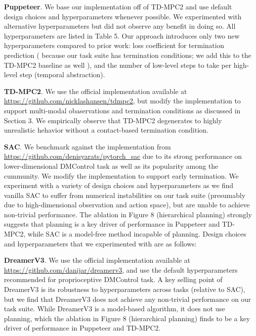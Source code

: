 \documentclass[sn-mathphys-num]{sn-jnl}%
\theoremstyle{thmstyleone}%
\theoremstyle{thmstyletwo}%
\theoremstyle{thmstylethree}%
\begin{document}
\textbf{Puppeteer}.
We base our implementation off of TD-MPC2 and use default design choices and hyperparameters whenever possible.
We experimented with alternative hyperparameters but did not observe any benefit in doing so.
All hyperparameters are listed in Table 5.
Our approach introduces only two new hyperparameters compared to prior work:
loss coefficient for termination prediction
(
because our task suite has termination conditions; 
we add this to the TD-MPC2 baseline as well
),
and the number of low-level steps to take per high-level step (temporal abstraction).


\textbf{TD-MPC2}. 
We use the official implementation available at \href{https://github.com/nicklashansen/tdmpc2}{https://github.com/nicklashansen/tdmpc2}, but modify the implementation to support multi-modal obaservations and termination conditions as discussed in Section 3.
We empirically observe that TD-MPC2 degenerates to highly unrealistic hehavior without a contact-based termination condition.


\textbf{SAC}. 
We benchmark against the implementation from \href{https://github.com/denisyarats/pytorch_sac}{https://github.com/denisyarats/pytorch\_sac} due to its strong performance on lower-dimensional DMControl task as well as its popularity among the cummunity.
We modify the implementation to support early termination.
We experiment with a variety of design choices and hyperparameters as we find vanilla SAC to suffer from numerical instabilities on our task suite (presumably due to high-dimensional observation and action space), but are unable to achieve non-trivial performance.
The ablation in Figure 8 (hierarchical planning) strongly suggests that planning is a key driver of performance in Puppeteer and TD-MPC2, while SAC is a model-free method incapable of planning.
Design choices and hyperparameters that we experimented with are as follows:


\textbf{DreamerV3}. 
We use the official implementation available at \href{https://github.com/danijar/dreamerv3}{https://github.com/danijar/dreamerv3}, and use the default hyperparameters recommended for proprioceptive DMControl task.
A key selling point of DreamerV3 is its robustness to hyperparameters across tasks (relative to SAC), but we find that DreamerV3 does not achieve any non-trivial performance on our task suite.
While DreamerV3 is a model-based algorithm, it does not use planning, which the ablation in Figure 8 (hierarchical planning) finds to be a key driver of performance in Puppeteer and TD-MPC2.
\end{document}
